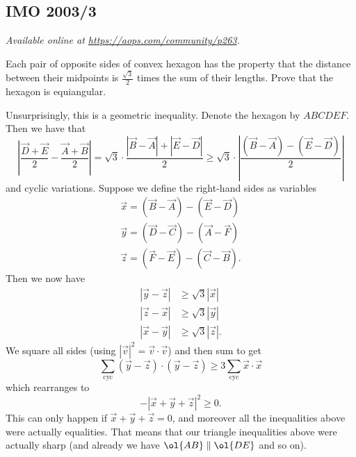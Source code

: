 \documentclass[11pt]{scrartcl}
\begin{document}
\subsection{IMO 2003/3}
\textsl{Available online at \url{https://aops.com/community/p263}.}
\begin{mdframed}[style=mdpurplebox,frametitle={Problem statement}]
Each pair of opposite sides of convex hexagon has the property that
the distance between their midpoints is $\frac{\sqrt3}{2}$
times the sum of their lengths.
Prove that the hexagon is equiangular.
\end{mdframed}
Unsurprisingly, this is a geometric inequality.
Denote the hexagon by $ABCDEF$.
Then we have that
\[
  \left\lvert
  \frac{\vec D + \vec E}{2} - \frac{\vec A + \vec B}{2}
  \right\rvert
  = \sqrt3 \cdot \frac{\left\lvert \vec B - \vec A \right\rvert
    + \left\lvert \vec E - \vec D \right\rvert}{2}
  \ge \sqrt 3 \cdot
  \left\lvert \frac{(\vec B - \vec A) - (\vec E - \vec D)}{2}  \right\rvert
\]
and cyclic variations.
Suppose we define the right-hand sides as variables
\begin{align*}
  \vec x = (\vec B - \vec A) - (\vec E - \vec D) \\
  \vec y = (\vec D - \vec C) - (\vec A - \vec F) \\
  \vec z = (\vec F - \vec E) - (\vec C - \vec B).
\end{align*}
Then we now have
\begin{align*}
  \left\lvert \vec y - \vec z \right\rvert
  &\ge \sqrt 3 \left\lvert \vec x  \right\rvert \\
  \left\lvert \vec z - \vec x \right\rvert
  &\ge \sqrt 3 \left\lvert \vec y  \right\rvert \\
  \left\lvert \vec x - \vec y \right\rvert
  &\ge \sqrt 3 \left\lvert \vec z  \right\rvert.
\end{align*}
We square all sides (using
$\left\lvert \vec v \right\rvert^2 = \vec v \cdot \vec v$)
and then sum to get
\[ \sum_{\text{cyc}} (\vec y - \vec z) \cdot (\vec y - \vec z)
  \ge 3 \sum_{\text{cyc}} \vec x \cdot \vec x \]
which rearranges to
\[- \left\lvert \vec x + \vec y + \vec z \right\rvert^2 \ge 0. \]
This can only happen if $\vec x + \vec y + \vec z =0$,
and moreover all the inequalities above were actually equalities.
That means that our triangle inequalities above were actually sharp
(and already we have $\ol{AB} \parallel \ol{DE}$ and so on).
\end{document}
